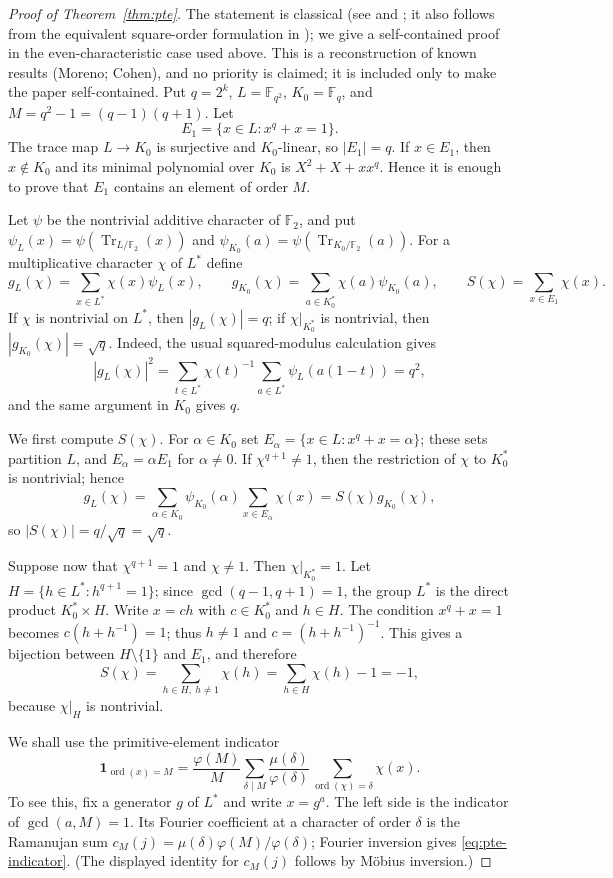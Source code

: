\begin{proof}[Proof of Theorem~\ref{thm:pte}]
The statement is classical (see \cite{Mor} and
\cite[Theorem~1, p.~1]{Coh90}; it also follows from the equivalent square-order formulation in
\cite[Theorem~1.5, p.~170]{Coh}); we give a self-contained proof in the
even-characteristic case used above. This is a reconstruction of known results (Moreno; Cohen), and no priority is claimed; it is included only to make the paper self-contained.
Put $q=2^k$, $L=\mathbb{F}_{q^2}$, $K_0=\mathbb{F}_q$, and
$M=q^2-1=(q-1)(q+1)$. Let
\[
E_1=\{x\in L:x^q+x=1\}.
\]
The trace map $L\to K_0$ is surjective and $K_0$-linear, so $|E_1|=q$. If
$x\in E_1$, then $x\notin K_0$ and its minimal polynomial over $K_0$ is
$X^2+X+xx^q$. Hence it is enough to prove that $E_1$ contains an element of
order $M$.

Let $\psi$ be the nontrivial additive character of $\mathbb F_2$, and put
$\psi_L(x)=\psi(\operatorname{Tr}_{L/\mathbb F_2}(x))$ and
$\psi_{K_0}(a)=\psi(\operatorname{Tr}_{K_0/\mathbb F_2}(a))$. For a multiplicative
character $\chi$ of $L^*$ define
\[
g_L(\chi)=\sum_{x\in L^*}\chi(x)\psi_L(x),\qquad
g_{K_0}(\chi)=\sum_{a\in K_0^*}\chi(a)\psi_{K_0}(a),\qquad
S(\chi)=\sum_{x\in E_1}\chi(x).
\]
If $\chi$ is nontrivial on $L^*$, then $|g_L(\chi)|=q$; if
$\chi|_{K_0^*}$ is nontrivial, then $|g_{K_0}(\chi)|=\sqrt q$. Indeed, the usual
squared-modulus calculation gives
\[
|g_L(\chi)|^2
=\sum_{t\in L^*}\chi(t)^{-1}\sum_{a\in L^*}\psi_L(a(1-t))=q^2,
\]
and the same argument in $K_0$ gives $q$.

We first compute $S(\chi)$. For $\alpha\in K_0$ set
$E_\alpha=\{x\in L:x^q+x=\alpha\}$; these sets partition $L$, and
$E_\alpha=\alpha E_1$ for $\alpha\ne0$. If $\chi^{q+1}\ne1$, then the
restriction of $\chi$ to $K_0^*$ is nontrivial; hence
\[
g_L(\chi)
=\sum_{\alpha\in K_0}\psi_{K_0}(\alpha)\sum_{x\in E_\alpha}\chi(x)
=S(\chi)g_{K_0}(\chi),
\]
so $|S(\chi)|=q/\sqrt q=\sqrt q$.

Suppose now that $\chi^{q+1}=1$ and $\chi\ne1$. Then $\chi|_{K_0^*}=1$.
Let $H=\{h\in L^*:h^{q+1}=1\}$; since $\gcd(q-1,q+1)=1$, the group $L^*$
is the direct product $K_0^*\times H$. Write $x=ch$ with $c\in K_0^*$ and
$h\in H$. The condition $x^q+x=1$ becomes
$c(h+h^{-1})=1$; thus $h\ne1$ and $c=(h+h^{-1})^{-1}$. This gives a
bijection between $H\setminus\{1\}$ and $E_1$, and therefore
\[
S(\chi)=\sum_{h\in H,\ h\ne1}\chi(h)
=\sum_{h\in H}\chi(h)-1=-1,
\]
because $\chi|_H$ is nontrivial.

We shall use the primitive-element indicator
\begin{equation}\label{eq:pte-indicator}
\mathbf 1_{\operatorname{ord}(x)=M}
=\frac{\varphi(M)}M
\sum_{\delta\mid M}\frac{\mu(\delta)}{\varphi(\delta)}
\sum_{\operatorname{ord}(\chi)=\delta}\chi(x).
\end{equation}
To see this, fix a generator $g$ of $L^*$ and write $x=g^a$. The left side
is the indicator of $\gcd(a,M)=1$. Its Fourier coefficient at a character
of order $\delta$ is the Ramanujan sum
$c_M(j)=\mu(\delta)\varphi(M)/\varphi(\delta)$; Fourier inversion gives
\eqref{eq:pte-indicator}. (The displayed identity for $c_M(j)$ follows by
M\"obius inversion.)


\end{proof}
